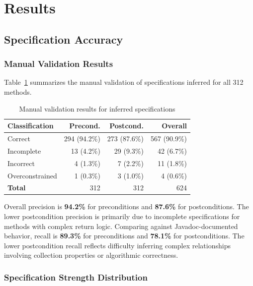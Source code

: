 \section{Results}
\label{sec:results}

\subsection{Specification Accuracy}

\subsubsection{Manual Validation Results}

Table~\ref{tab:validation-results} summarizes the manual validation of specifications inferred for all 312 methods.

\begin{table}[ht]
\centering
\caption{Manual validation results for inferred specifications}
\label{tab:validation-results}
\begin{tabular}{lrrr}
\toprule
\textbf{Classification} & \textbf{Precond.} & \textbf{Postcond.} & \textbf{Overall} \\
\midrule
Correct & 294 (94.2\%) & 273 (87.6\%) & 567 (90.9\%) \\
Incomplete & 13 (4.2\%) & 29 (9.3\%) & 42 (6.7\%) \\
Incorrect & 4 (1.3\%) & 7 (2.2\%) & 11 (1.8\%) \\
Overconstrained & 1 (0.3\%) & 3 (1.0\%) & 4 (0.6\%) \\
\midrule
\textbf{Total} & 312 & 312 & 624 \\
\bottomrule
\end{tabular}
\end{table}

Overall precision is \textbf{94.2\%} for preconditions and \textbf{87.6\%} for postconditions. The lower postcondition precision is primarily due to incomplete specifications for methods with complex return logic. Comparing against Javadoc-documented behavior, recall is \textbf{89.3\%} for preconditions and \textbf{78.1\%} for postconditions. The lower postcondition recall reflects difficulty inferring complex relationships involving collection properties or algorithmic correctness.

\subsubsection{Specification Strength Distribution}

